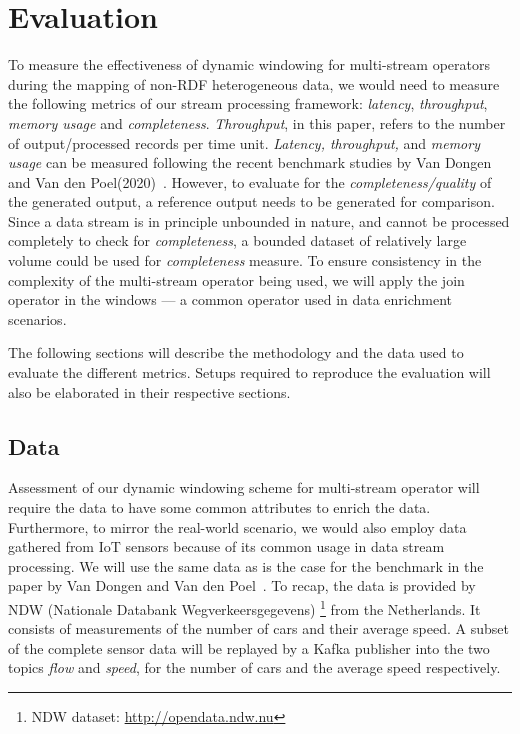 \chapter{Evaluation}

To measure the effectiveness of dynamic windowing for multi-stream operators during the 
mapping of non-RDF heterogeneous data, we would need to measure the following 
metrics of our stream processing framework: \emph{latency}, \emph{throughput},
\emph{memory usage} and \emph{completeness}. \emph{Throughput}, in this 
paper, refers to the number of output/processed records per time unit. 
\emph{Latency, throughput,} and \emph{memory usage} can be measured following the recent benchmark studies by 
Van Dongen and Van den Poel(2020)~\cite{evalution_of_spe}.
However, to evaluate 
for the \emph{completeness/quality} of the generated output, a reference output needs 
to be generated for comparison. Since a data stream is in principle unbounded in nature, 
and cannot be processed completely to check for \emph{completeness}, a bounded 
dataset of relatively large volume could be used for \emph{completeness} measure.
To ensure consistency in the complexity of the multi-stream operator being used, 
we will apply the join operator in the windows --- a common operator used in 
data enrichment scenarios. 


The following sections will describe the methodology and the data used to evaluate the
different metrics. Setups required to reproduce the evaluation will also be elaborated 
in their respective sections. 


\section{Data}

Assessment of our dynamic windowing scheme for multi-stream operator will require 
the data to have some common attributes to enrich the data. Furthermore, to 
mirror the real-world scenario, we would also employ data gathered from IoT sensors
because of its common usage in data stream processing. We will use the same data 
as is the case for the benchmark in the paper by Van Dongen and Van den Poel~\cite{evalution_of_spe}. 
To recap, the data is provided by NDW (Nationale Databank Wegverkeersgegevens)
\footnote{NDW dataset: \href{http://opendata.ndw.nu}{http://opendata.ndw.nu} } from the 
Netherlands. It consists of measurements of the number of cars and their average speed. 
A subset of the complete sensor data will be replayed by a Kafka publisher into the two topics 
\emph{flow} and \emph{speed}, for the number of cars and the average speed respectively. 

